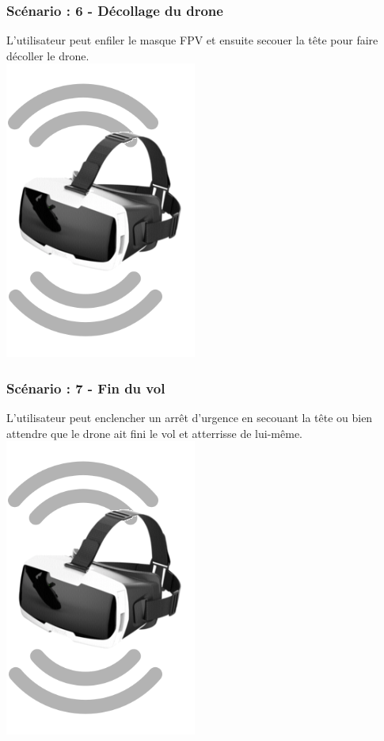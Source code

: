 \documentclass{beamer}
\begin{document}
	\begin{frame}
		\begin{center}
		\frametitle{Scénario : 6 - Décollage du drone}
        L'utilisateur peut enfiler le masque FPV et ensuite secouer la tête pour faire décoller le drone.\\
        \includegraphics[scale=0.4]{shake.png}
		\end{center}
	\end{frame}
	


	\begin{frame}
		\begin{center}
		\frametitle{Scénario : 7 - Fin du vol}
        L'utilisateur peut enclencher un arrêt d'urgence en secouant la tête ou bien attendre que le drone ait fini le vol et atterrisse de lui-même.\\
        \includegraphics[scale=0.4]{shake.png}
		\end{center}
	\end{frame}
	
\end{document}
